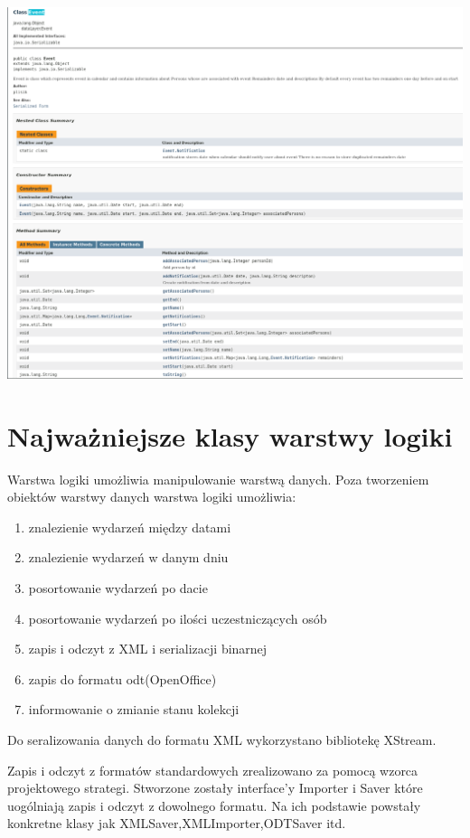 \documentclass[a4paper,12pt]{article}
\begin{document}
\begin{minipage}{\textwidth}

    \includegraphics[width=\textwidth]{./screen/dataLayer/Event.png}
    \label{Event}

\end{minipage}


\section{Najważniejsze klasy warstwy logiki}
       Warstwa logiki umożliwia manipulowanie warstwą danych. Poza tworzeniem obiektów warstwy danych warstwa logiki umożliwia:
\begin{enumerate}
 \item znalezienie wydarzeń między datami
 \item znalezienie wydarzeń w danym dniu
 \item posortowanie wydarzeń po dacie 
 \item posortowanie wydarzeń po ilości uczestniczących osób
 \item zapis i odczyt z XML i serializacji binarnej
 \item zapis do formatu odt(OpenOffice)
 \item informowanie o zmianie stanu kolekcji
\end{enumerate}

Do seralizowania danych do formatu XML wykorzystano bibliotekę XStream.

Zapis i odczyt z formatów standardowych zrealizowano za pomocą wzorca projektowego strategi. Stworzone zostały interface'y Importer i Saver które uogólniają zapis i odczyt z dowolnego formatu. Na ich podstawie powstały konkretne klasy jak XMLSaver,XMLImporter,ODTSaver itd.
\end{document}
